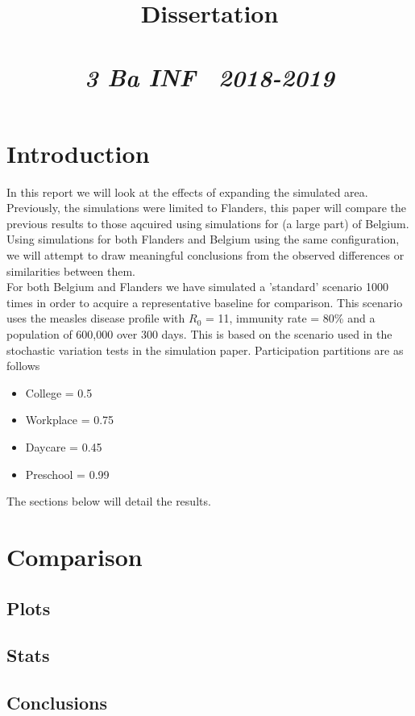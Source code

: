 \documentclass{article}
\title{\textmd{\textbf{Dissertation}}\\\normalsize\vspace{0.1in}\Large{\assignmentname}\\\vspace{0.1in}\small{\textit{3 Ba INF \  2018-2019}}}
\author{\studentA}
\date{}
\begin{document}
\maketitle

\section{Introduction}
In this report we will look at the effects of expanding the simulated area. Previously, the simulations were limited to Flanders, this paper will compare the previous results to those aqcuired using simulations for (a large part) of Belgium. Using simulations for both Flanders and Belgium using the same configuration, we will attempt to draw meaningful conclusions from the observed differences or similarities between them. \\
For both Belgium and Flanders we have simulated a 'standard' scenario 1000 times in order to acquire a representative baseline for comparison. This scenario uses the measles disease profile with $R_0$ = 11, immunity rate = 80\% and a population of 600,000 over 300 days. This is based on the scenario used in the stochastic variation tests in the simulation paper. Participation partitions are as follows
\begin{itemize}
	\item College = 0.5
	\item Workplace = 0.75
	\item Daycare = 0.45
	\item Preschool = 0.99
\end{itemize} 
The sections below will detail the results.


\section{Comparison}
\subsection{Plots}

\subsection{Stats}

\subsection{Conclusions}
\end{document}
